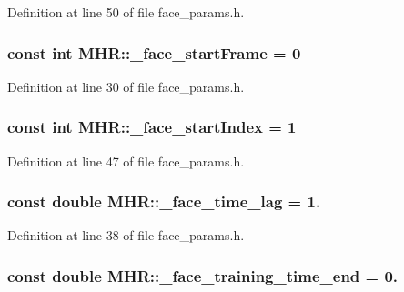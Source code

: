 Definition at line 50 of file face\+\_\+params.\+h.

\hypertarget{namespace_m_h_r_ac893410fca7e7a76ae562e47f8371cc1}{
\subsubsection[{\+\_\+face\+\_\+start\+Frame}]{\setlength{\rightskip}{0pt plus 5cm}const int M\+H\+R\+::\+\_\+face\+\_\+start\+Frame = 0}}\label{namespace_m_h_r_ac893410fca7e7a76ae562e47f8371cc1}


Definition at line 30 of file face\+\_\+params.\+h.

\hypertarget{namespace_m_h_r_a5c705653d488611b87b11e41e4ffbfd5}{
\subsubsection[{\+\_\+face\+\_\+start\+Index}]{\setlength{\rightskip}{0pt plus 5cm}const int M\+H\+R\+::\+\_\+face\+\_\+start\+Index = 1}}\label{namespace_m_h_r_a5c705653d488611b87b11e41e4ffbfd5}


Definition at line 47 of file face\+\_\+params.\+h.

\hypertarget{namespace_m_h_r_ad108537351ba024dfa150411983a69c4}{
\subsubsection[{\+\_\+face\+\_\+time\+\_\+lag}]{\setlength{\rightskip}{0pt plus 5cm}const double M\+H\+R\+::\+\_\+face\+\_\+time\+\_\+lag = 1.}}\label{namespace_m_h_r_ad108537351ba024dfa150411983a69c4}


Definition at line 38 of file face\+\_\+params.\+h.

\hypertarget{namespace_m_h_r_a86e77ed79df316c170e425d131558571}{
\subsubsection[{\+\_\+face\+\_\+training\+\_\+time\+\_\+end}]{\setlength{\rightskip}{0pt plus 5cm}const double M\+H\+R\+::\+\_\+face\+\_\+training\+\_\+time\+\_\+end = 0.}}\label{namespace_m_h_r_a86e77ed79df316c170e425d131558571}


